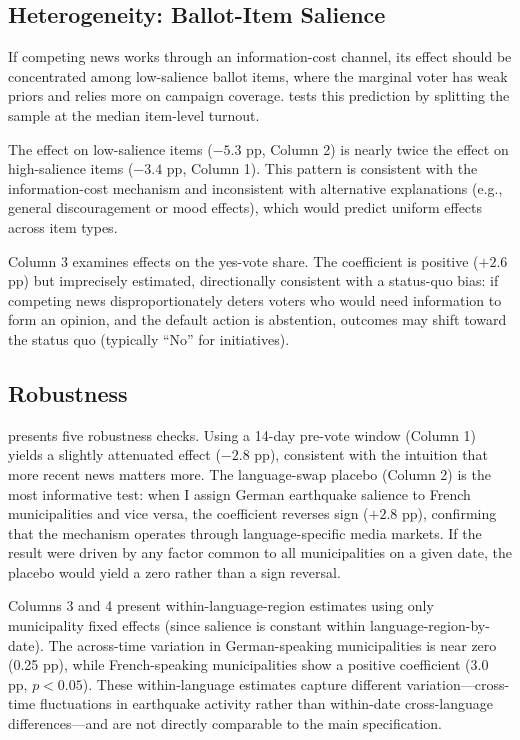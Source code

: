 \documentclass[12pt]{article}
\begin{document}
{\small}

\subsection{Heterogeneity: Ballot-Item Salience}

If competing news works through an information-cost channel, its effect should be concentrated among low-salience ballot items, where the marginal voter has weak priors and relies more on campaign coverage.  tests this prediction by splitting the sample at the median item-level turnout.

The effect on low-salience items ($-5.3$ pp, Column 2) is nearly twice the effect on high-salience items ($-3.4$ pp, Column 1). This pattern is consistent with the information-cost mechanism and inconsistent with alternative explanations (e.g., general discouragement or mood effects), which would predict uniform effects across item types.

Column 3 examines effects on the yes-vote share. The coefficient is positive ($+2.6$ pp) but imprecisely estimated, directionally consistent with a status-quo bias: if competing news disproportionately deters voters who would need information to form an opinion, and the default action is abstention, outcomes may shift toward the status quo (typically ``No'' for initiatives).

{\small}

\subsection{Robustness}

 presents five robustness checks. Using a 14-day pre-vote window (Column 1) yields a slightly attenuated effect ($-2.8$ pp), consistent with the intuition that more recent news matters more. The language-swap placebo (Column 2) is the most informative test: when I assign German earthquake salience to French municipalities and vice versa, the coefficient reverses sign ($+2.8$ pp), confirming that the mechanism operates through language-specific media markets. If the result were driven by any factor common to all municipalities on a given date, the placebo would yield a zero rather than a sign reversal.

Columns 3 and 4 present within-language-region estimates using only municipality fixed effects (since salience is constant within language-region-by-date). The across-time variation in German-speaking municipalities is near zero (0.25 pp), while French-speaking municipalities show a positive coefficient (3.0 pp, $p < 0.05$). These within-language estimates capture different variation---cross-time fluctuations in earthquake activity rather than within-date cross-language differences---and are not directly comparable to the main specification.
\end{document}
